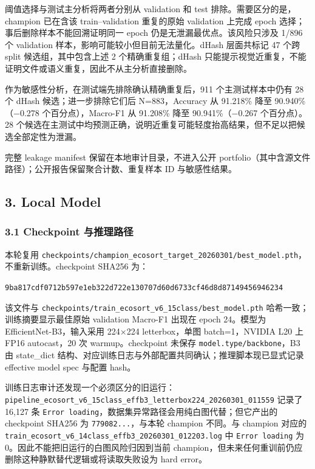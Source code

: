 \documentclass[
  a4paper,
]{article}
\begin{document}
阈值选择与测试主分析将两者分别从 validation 和 test
排除。需要区分的是，champion 已在含该 train--validation 重复的原始
validation 上完成 epoch 选择；事后删除样本不能回溯证明同一 epoch
仍是无泄漏最优点。该风险只涉及 1/896 个 validation
样本，影响可能较小但目前无法量化。dHash 层面共标记 47 个跨 split
候选组，其中包含上述 2 个精确重复组；dHash
只能提示视觉近重复，不能证明文件或语义重复，因此不从主分析直接删除。

作为敏感性分析，在测试端先排除确认精确重复后，911 个主测试样本中仍有 28
个 dHash 候选；进一步排除它们后 N=883，Accuracy 从 91.218\% 降至
90.940\%（−0.278 个百分点），Macro-F1 从 91.208\% 降至 90.941\%（−0.267
个百分点）。28
个候选在主测试中均预测正确，说明近重复可能轻度抬高结果，但不足以把候选全部定性为泄漏。

完整 leakage manifest 保留在本地审计目录，不进入公开
portfolio（其中含源文件路径）；公开报告保留聚合计数、重复样本 ID
与敏感性结果。

\hypertarget{3-local-model}{%
\subsection{3. Local Model}\label{3-local-model}}

\hypertarget{31-checkpoint-ux4e0eux63a8ux7406ux8defux5f84}{%
\subsubsection{3.1 Checkpoint
与推理路径}\label{31-checkpoint-ux4e0eux63a8ux7406ux8defux5f84}}

本轮复用
\texttt{checkpoints/champion\_ecosort\_target\_20260301/best\_model.pth}，不重新训练。checkpoint
SHA256 为：

\texttt{9ba817cdf0712b597e1eb322d722e130707d60d6733cf46d8d87149456946234}

该文件与
\texttt{checkpoints/train\_ecosort\_v6\_15class/best\_model.pth}
哈希一致；训练摘要显示最佳原始 validation Macro-F1 出现在 epoch
24。模型为 EfficientNet-B3，输入采用 224×224 letterbox，单图
batch=1，NVIDIA L20 上 FP16 autocast，20 次 warmup。checkpoint 未保存
\texttt{model.type/backbone}，B3 由 state\_dict
结构、对应训练日志与外部配置共同确认；推理脚本现已显式记录 effective
model spec 与配置 hash。

训练日志审计还发现一个必须区分的旧运行：\texttt{pipeline\_ecosort\_v6\_15class\_effb3\_letterbox224\_20260301\_011559}
记录了 16,127 条
\texttt{Error\ loading}，数据集异常路径会用纯白图代替；但它产出的
checkpoint SHA256 为 \texttt{779082...}，与本轮 champion 不同。与
champion 对应的
\texttt{train\_ecosort\_v6\_14class\_effb3\_20260301\_012203.log} 中
\texttt{Error\ loading} 为 0。因此不能把旧运行的白图风险归因到当前
champion，但未来任何重训前仍应删除这种静默替代逻辑或将读取失败设为 hard
error。
\end{document}
